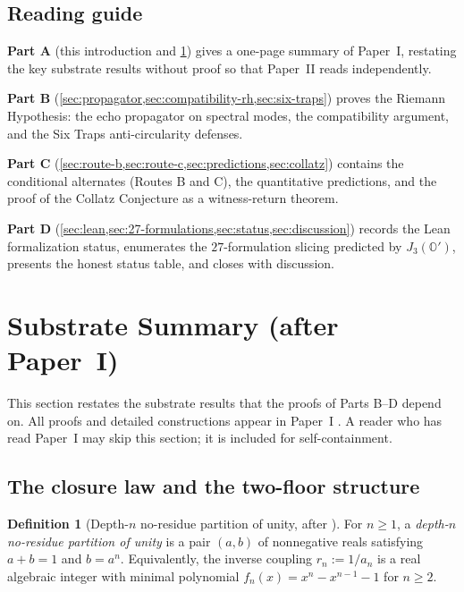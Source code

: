 \documentclass[11pt,a4paper]{article}
\theoremstyle{plain}
\theoremstyle{definition}
\newtheorem{definition}[theorem]{Definition}
\theoremstyle{remark}
\numberwithin{equation}{section}
\providecommand{\Os}{\mathbb{O}'}
\begin{document}
\subsection*{Reading guide}

\textbf{Part A} (this introduction and \cref{sec:substrate-summary})
gives a one-page summary of Paper~I, restating the key substrate
results without proof so that Paper~II reads independently.

\textbf{Part B} (\cref{sec:propagator,sec:compatibility-rh,sec:six-traps})
proves the Riemann Hypothesis: the echo propagator on spectral
modes, the compatibility argument, and the Six Traps
anti-circularity defenses.

\textbf{Part C} (\cref{sec:route-b,sec:route-c,sec:predictions,sec:collatz})
contains the conditional alternates (Routes B and C), the
quantitative predictions, and the proof of the Collatz Conjecture
as a witness-return theorem.

\textbf{Part D} (\cref{sec:lean,sec:27-formulations,sec:status,sec:discussion})
records the Lean formalization status, enumerates the
$27$-formulation slicing predicted by $J_3(\Os)$, presents the
honest status table, and closes with discussion.

\section{Substrate Summary (after Paper~I)}
\label{sec:substrate-summary}

This section restates the substrate results that the proofs of
Parts B--D depend on.  All proofs and detailed constructions
appear in Paper~I \cite{paper-I-substrate}.  A reader who has read
Paper~I may skip this section; it is included for self-containment.

\subsection{The closure law and the two-floor structure}
\label{sec:closure-law}

\begin{definition}[Depth-$n$ no-residue partition of unity, after {\cite[Def.~2.1]{paper-I-substrate}}]
\label{def:partition}
For $n \ge 1$, a \emph{depth-$n$ no-residue partition of unity} is
a pair $(a,b)$ of nonnegative reals satisfying $a + b = 1$ and
$b = a^n$.  Equivalently, the inverse coupling
$r_n := 1/a_n$ is a real algebraic integer with minimal
polynomial $f_n(x) = x^n - x^{n-1} - 1$ for $n \ge 2$.
\end{definition}
\end{document}
